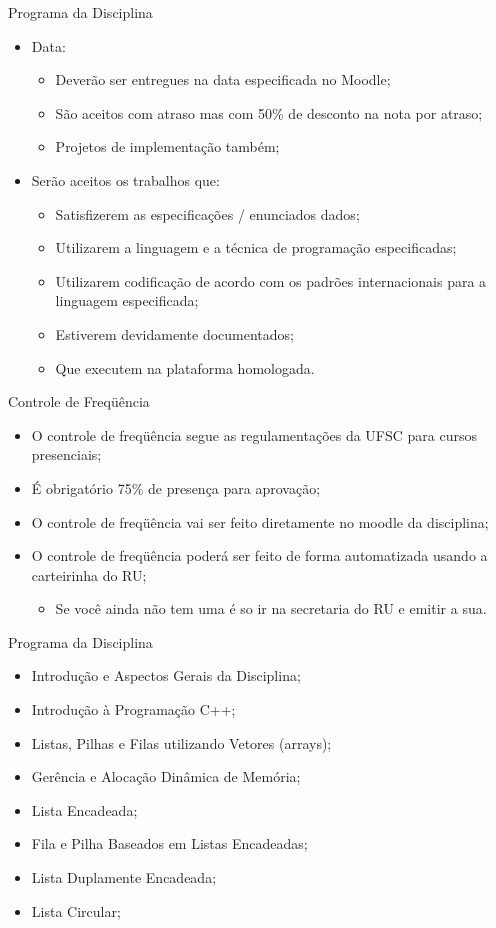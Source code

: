 \documentclass[12pt]{beamer}
\begin{document}
\begin{frame}{Programa da Disciplina}
\begin{itemize}
\item Data:
\begin{itemize}
\item Deverão ser entregues na data especificada no Moodle;
\item São aceitos com atraso mas com 50\% de desconto na nota por atraso;
\item Projetos de implementação também;
\end{itemize}
\item Serão aceitos os trabalhos que:
\begin{itemize}
\item Satisfizerem as especificações / enunciados dados;
\item Utilizarem a linguagem e a técnica de programação especificadas;
\item Utilizarem codificação de acordo com os padrões internacionais para a linguagem especificada;
\item Estiverem devidamente documentados;
\item Que executem na plataforma homologada.
\end{itemize}
\end{itemize}
\end{frame}

\begin{frame}{Controle de Freqüência}
\begin{itemize}
\item O controle de freqüência segue as regulamentações da UFSC para cursos presenciais;
\item É obrigatório 75\% de presença para aprovação;
\item O controle de freqüência vai ser feito diretamente no moodle da disciplina;
\item O controle de freqüência poderá ser feito de forma automatizada usando a carteirinha do RU;
\begin{itemize}
\item Se você ainda não tem uma é so ir na secretaria do RU e emitir a sua.
\end{itemize}
\end{itemize}
\end{frame}

\begin{frame}{Programa da Disciplina}
\begin{itemize}
\item Introdução e Aspectos Gerais da Disciplina;
\item Introdução à Programação C++;
\item Listas, Pilhas e Filas utilizando Vetores (arrays);
\item Gerência e Alocação Dinâmica de Memória;
\item Lista Encadeada;
\item Fila e Pilha Baseados em Listas Encadeadas;
\item Lista Duplamente Encadeada;
\item Lista Circular;
\end{itemize}
\end{frame}
\end{document}
